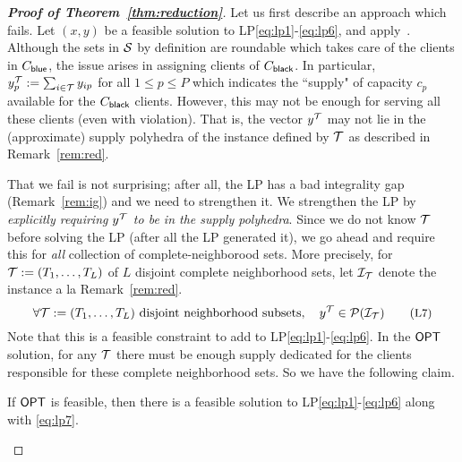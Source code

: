 \begin{proof}[{\bf Proof of Theorem~\ref{thm:reduction}}]

Let us first describe an approach which fails. Let $(x,y)$ be a feasible solution to LP\eqref{eq:lp1}-\eqref{eq:lp6}, and apply~. 
Although the sets in ${\cal S}$ by definition are roundable which takes care of the clients in $C_{\mathsf{blue}}$, the issue arises in assigning clients of $C_{\mathsf{black}}$.
In particular, $y^{\cal T}_p := \sum_{i\in {\cal T}} y_{ip}$ for all $1\le p\le P$ which indicates the ``supply" of capacity $c_p$ available for the $C_{\mathsf{black}}$ clients.
However, this may not be enough for serving all these clients (even with violation).
That is, the vector $y^{\cal T}$ may not lie in the (approximate) supply polyhedra of the \cckp instance
defined by ${\cal T}$ as described in Remark~\ref{rem:red}. 

That we fail is not surprising; after all, the LP has a bad integrality gap (Remark~\ref{rem:ig}) and we need to strengthen it.
We strengthen the LP by {\em explicitly requiring $y^{\cal T}$ to be in the supply polyhedra}. Since we do not know ${\cal T}$ before solving the LP (after all the LP generated it), 
we go ahead and require this for {\em all} collection of complete-neighborood sets. 
More precisely, for ${\cal T} := (T_1,\ldots,T_L)$ of $L$ disjoint complete neighborhood sets, let ${\cal I}_{\cal T}$ denote the \cckp instance a la Remark~\ref{rem:red}.
\begin{equation}\label{eq:lp7}
\forall \calT := (T_1,\ldots,T_L) \textrm{ disjoint neighborhood subsets}, \quad \yy \in \calP(\calI_\calT) \tag{\small{L7}}
\end{equation}
Note that this is a feasible constraint to add to LP\eqref{eq:lp1}-\eqref{eq:lp6}. In the $\mathsf{OPT}$ solution, for any ${\cal T}$ there must be enough supply dedicated for the clients responsible for these complete neighborhood sets. So we have the following claim.
\begin{claim}\label{clm:trivial}
	If $\mathsf{OPT}$ is feasible, then there is a feasible solution to LP\eqref{eq:lp1}-\eqref{eq:lp6} along with \eqref{eq:lp7}.
\end{claim}


\end{proof}
